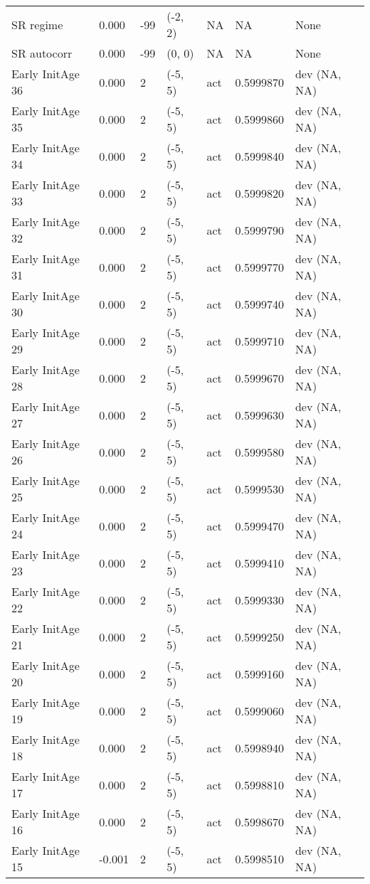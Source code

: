 \documentclass[11pt,
  english,
  letterpaper,
]{article}
\begin{document}
\begin{landscape}
\begin{longtable}[t]{>{\raggedright\arraybackslash}p{7cm}lllll>{\raggedright\arraybackslash}p{4cm}}
SR regime & 0.000 & -99 & (-2, 2) & NA & NA & None\\
SR autocorr & 0.000 & -99 & (0, 0) & NA & NA & None\\
Early InitAge 36 & 0.000 & 2 & (-5, 5) & act & 0.5999870 & dev (NA, NA)\\
Early InitAge 35 & 0.000 & 2 & (-5, 5) & act & 0.5999860 & dev (NA, NA)\\
Early InitAge 34 & 0.000 & 2 & (-5, 5) & act & 0.5999840 & dev (NA, NA)\\
Early InitAge 33 & 0.000 & 2 & (-5, 5) & act & 0.5999820 & dev (NA, NA)\\
Early InitAge 32 & 0.000 & 2 & (-5, 5) & act & 0.5999790 & dev (NA, NA)\\
Early InitAge 31 & 0.000 & 2 & (-5, 5) & act & 0.5999770 & dev (NA, NA)\\
Early InitAge 30 & 0.000 & 2 & (-5, 5) & act & 0.5999740 & dev (NA, NA)\\
Early InitAge 29 & 0.000 & 2 & (-5, 5) & act & 0.5999710 & dev (NA, NA)\\
Early InitAge 28 & 0.000 & 2 & (-5, 5) & act & 0.5999670 & dev (NA, NA)\\
Early InitAge 27 & 0.000 & 2 & (-5, 5) & act & 0.5999630 & dev (NA, NA)\\
Early InitAge 26 & 0.000 & 2 & (-5, 5) & act & 0.5999580 & dev (NA, NA)\\
Early InitAge 25 & 0.000 & 2 & (-5, 5) & act & 0.5999530 & dev (NA, NA)\\
Early InitAge 24 & 0.000 & 2 & (-5, 5) & act & 0.5999470 & dev (NA, NA)\\
Early InitAge 23 & 0.000 & 2 & (-5, 5) & act & 0.5999410 & dev (NA, NA)\\
Early InitAge 22 & 0.000 & 2 & (-5, 5) & act & 0.5999330 & dev (NA, NA)\\
Early InitAge 21 & 0.000 & 2 & (-5, 5) & act & 0.5999250 & dev (NA, NA)\\
Early InitAge 20 & 0.000 & 2 & (-5, 5) & act & 0.5999160 & dev (NA, NA)\\
Early InitAge 19 & 0.000 & 2 & (-5, 5) & act & 0.5999060 & dev (NA, NA)\\
Early InitAge 18 & 0.000 & 2 & (-5, 5) & act & 0.5998940 & dev (NA, NA)\\
Early InitAge 17 & 0.000 & 2 & (-5, 5) & act & 0.5998810 & dev (NA, NA)\\
Early InitAge 16 & 0.000 & 2 & (-5, 5) & act & 0.5998670 & dev (NA, NA)\\
Early InitAge 15 & -0.001 & 2 & (-5, 5) & act & 0.5998510 & dev (NA, NA)\\

\end{longtable}
\end{landscape}
\end{document}
